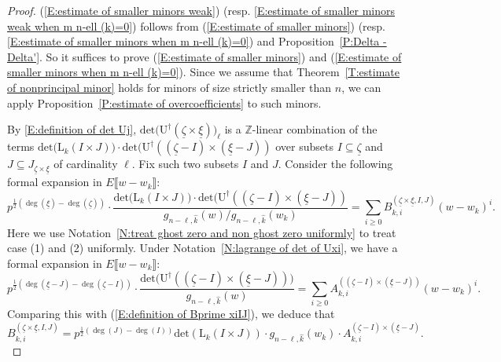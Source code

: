 \documentclass[12pt]{amsart}
\theoremstyle{definition}
\numberwithin{equation}{subsection}
\def\ZZ{\mathbb{Z}}
\def\rmL{\mathrm{L}}
\def\rmU{\mathrm{U}}
\renewcommand{\det}{\mathrm{det}}
\begin{document}
\begin{proof}
(\ref{E:estimate of smaller minors weak}) (resp. \eqref{E:estimate of smaller minors weak when m n-ell (k)=0}) follows from (\ref{E:estimate of smaller minors}) (resp. \eqref{E:estimate of smaller minors when m n-ell (k)=0}) and Proposition~\ref{P:Delta - Delta'}. So it suffices to prove (\ref{E:estimate of smaller minors}) and (\ref{E:estimate of smaller minors when m n-ell (k)=0}). Since we assume that Theorem~\ref{T:estimate of nonprincipal minor} holds for minors of size strictly smaller than $n$, we can apply Proposition~\ref{P:estimate of overcoefficients} to such minors.
	
By \eqref{E:definition of det Uj}, $\det \big(\rmU^\dagger(\underline \zeta \times \underline \xi) \big)_{\ell}$ 
	is a $\ZZ$-linear combination of the terms $
	\det \big( \rmL_k(I \times J)\big) \cdot \det \big( \rmU^\dagger((\underline \zeta-I) \times (\underline \xi-J))
	$ over subsets $I \subseteq \underline \zeta$ and $J \subseteq J_{\underline \zeta \times \underline \xi}$ of cardinality $\ell$. Fix such two subsets $I$ and $J$. Consider the following formal expansion in $E\llbracket w - w_k\rrbracket$:
	\begin{equation}
	\label{E:definition of Bprime xiIJ}
	p^{\frac 12(\deg(\underline \xi) - \deg(\underline \zeta))}\cdot\frac{\det \big( \rmL_k(I \times J)\big)\cdot  \det \big( \rmU^\dagger((\underline \zeta-I) \times (\underline \xi-J))}{
	g_{n-\ell,\hat k}(w)/g_{n-\ell,\hat{k}}(w_k)} = \sum_{i \geq 0} B^{(\underline \zeta \times \underline \xi,I, J)}_{k, i} (w-w_k)^i.
	\end{equation}
	Here we use Notation~\ref{N:treat ghost zero and non ghost zero uniformly} to treat case (1) and (2) uniformly. Under Notation~\ref{N:lagrange of det of Uxi}, we have a formal expansion in $E\llbracket w-w_k\rrbracket$:
		\[
		p^{\frac 12 (\deg(\underline \xi-J)-\deg(\underline \zeta-I))}\cdot \frac{\det\big(\rmU^\dagger((\underline\zeta-I)\times (\underline\xi-J)) \big)}{g_{n-\ell,\hat{k}}(w)}=\sum_{i\geq 0} A_{k,i}^{((\underline \zeta-I)\times(\underline \xi-J))}(w-w_k)^i.
		\]
Comparing this with (\ref{E:definition of Bprime xiIJ}), we deduce that 
		\begin{equation}
		\label{E:relation between Bprime xi IJ and A xi IJ}
		B^{(\underline \zeta \times \underline \xi,I, J)}_{k, i}=p^{\frac 12 (\deg (J)-\deg(I))}\det (\rmL_k(I\times J))\cdot g_{n-\ell,\hat{k}}(w_k)\cdot A_{k,i}^{(\underline \zeta-I)\times (\underline \xi-J)}.
		\end{equation}

\end{proof}
\end{document}

